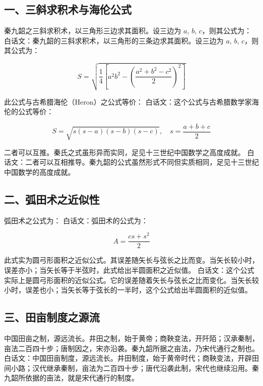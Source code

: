 \documentclass[11pt,a4paper]{article}
\newcommand{\origtext}[1]{{\color{origcolor}#1}}
\newcommand{\modtext}[1]{{\color{modcolor}#1}}
\begin{document}
\subsection*{\color{origcolor}一、三斜求积术与海伦公式}

\origtext{秦九韶之三斜求积术，以三角形三边求其面积。设三边为 $a$, $b$, $c$，则其公式为：}
\modtext{白话文：秦九韶的三斜求积术，以三角形的三条边求其面积。设三边为 $a$, $b$, $c$，则其公式为：}

\[
S = \sqrt{\frac{1}{4}\left[a^2b^2 - \left(\frac{a^2+b^2-c^2}{2}\right)^2\right]}
\]

\origtext{此公式与古希腊海伦（Heron）之公式等价：}
\modtext{白话文：这个公式与古希腊数学家海伦的公式等价：}

\[
S = \sqrt{s(s-a)(s-b)(s-c)}, \quad s = \frac{a+b+c}{2}
\]

\origtext{二者可以互推。秦氏之式虽形异而实同，足见十三世纪中国数学之高度成就。}
\modtext{白话文：二者可以互相推导。秦九韶的公式虽然形式不同但实质相同，足见十三世纪中国数学的高度成就。}

\subsection*{\color{origcolor}二、弧田术之近似性}

\origtext{弧田术之公式为：}
\modtext{白话文：弧田术的公式为：}

\[
A = \frac{cs + s^2}{2}
\]

\origtext{此式实为圆弓形面积之近似公式。其误差随矢长与弦长之比而变。当矢长较小时，误差亦小；当矢长等于半弦时，此式给出半圆面积之近似值。}
\modtext{白话文：这个公式实际上是圆弓形面积的近似公式。它的误差随着矢长与弦长之比而变化。当矢长较小时，误差也小；当矢长等于弦长的一半时，这个公式给出半圆面积的近似值。}

\subsection*{\color{origcolor}三、田亩制度之源流}

\origtext{中国田亩之制，源远流长。井田之制，始于黄帝；商鞅变法，开阡陌；汉承秦制，亩法二百四十步；唐制因之，宋亦沿袭。秦九韶所据之亩法，乃宋代通行之制也。}
\modtext{白话文：中国田亩制度，源远流长。井田制度，始于黄帝时代；商鞅变法，开辟田间小路；汉代继承秦制，亩法为二百四十步；唐代沿袭此制，宋代也继续沿用。秦九韶所依据的亩法，就是宋代通行的制度。}
\end{document}
